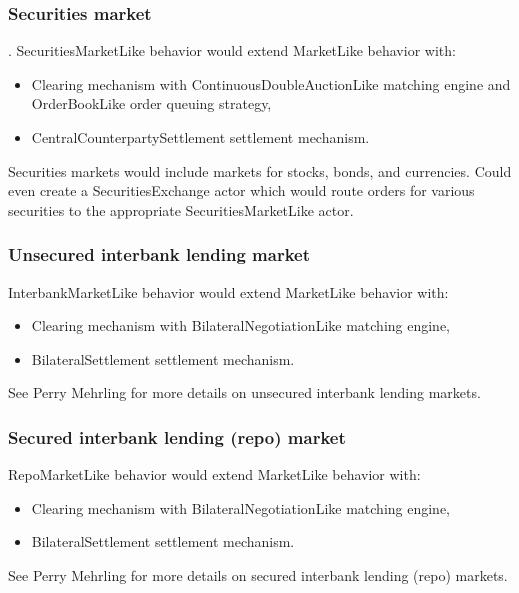 \documentclass[a4paper]{article}
\begin{document}
\subsubsection{Securities market}. SecuritiesMarketLike behavior would extend MarketLike behavior with:
\begin{itemize}
    \item Clearing mechanism with ContinuousDoubleAuctionLike matching engine and OrderBookLike order queuing strategy,
    \item CentralCounterpartySettlement settlement mechanism.
\end{itemize}
Securities markets would include markets for stocks, bonds, and currencies. Could even create a SecuritiesExchange actor which would route orders for various securities to the appropriate SecuritiesMarketLike actor.

\subsubsection{Unsecured interbank lending market} InterbankMarketLike behavior would extend MarketLike behavior with:
\begin{itemize}
    \item Clearing mechanism with BilateralNegotiationLike matching engine,
    \item BilateralSettlement settlement mechanism.
\end{itemize}
See Perry Mehrling for more details on unsecured interbank lending markets.

\subsubsection{Secured interbank lending (repo) market} RepoMarketLike behavior would extend MarketLike behavior with:
\begin{itemize}
    \item Clearing mechanism with BilateralNegotiationLike matching engine,
    \item BilateralSettlement settlement mechanism.
\end{itemize}
See Perry Mehrling for more details on secured interbank lending (repo) markets.




\end{document}
